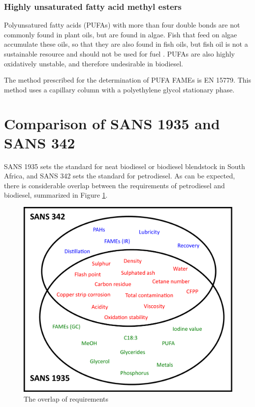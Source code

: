 \subsubsection{Highly unsaturated fatty acid methyl esters}

Polyunsatured fatty acids (PUFAs) with more than four double bonds are not
commonly found in plant oils, but are found in algae. Fish that feed on algae
accumulate these oils, so that they are also found in fish oils, but fish oil is
not a sustainable resource and should not be used for fuel
\autocite{Kitessa2014}. PUFAs are also highly oxidatively unstable, and
therefore undesirable in biodiesel.

The method prescribed for the determination of PUFA FAMEs is EN 15779. This
method uses a capillary column with a polyethylene glycol stationary phase.

\section{Comparison of SANS 1935 and SANS 342}

SANS 1935 sets the standard for neat biodiesel or biodiesel blendstock in South
Africa, and SANS 342 sets the standard for petrodiesel. As can be expected,
there is considerable overlap between the requirements of petrodiesel and
biodiesel, summarized in Figure \ref{fig:Venn}.

\begin{figure}
\centering
\includegraphics[width=\textwidth]{Figures/Venn.pdf}
\decoRule

\caption[Overlap of requirements ]{The overlap of requirements }

\label{fig:Venn}
\end{figure}

